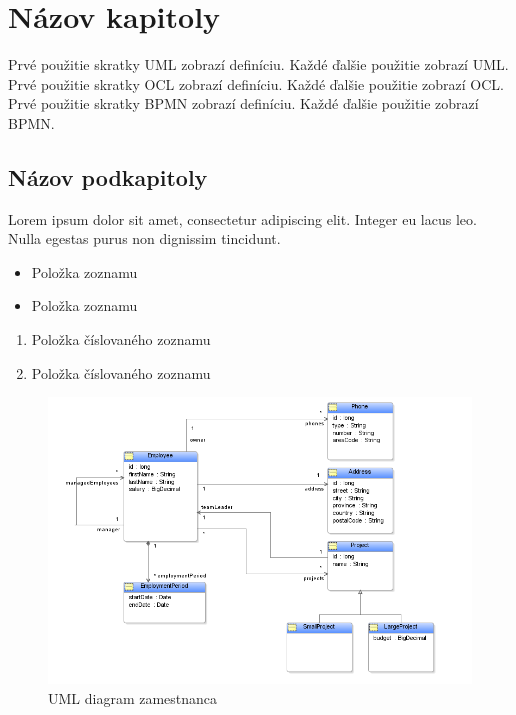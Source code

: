 \section{Názov kapitoly}
Prvé použitie skratky \gls{UML} zobrazí definíciu. Každé ďalšie použitie zobrazí \gls{UML}.\\
Prvé použitie skratky \gls{OCL} zobrazí definíciu. Každé ďalšie použitie zobrazí \gls{OCL}.\\
Prvé použitie skratky \gls{BPMN} zobrazí definíciu. Každé ďalšie použitie zobrazí \gls{BPMN}.

\subsection{Názov podkapitoly}
Lorem ipsum dolor sit amet, consectetur adipiscing elit. Integer eu lacus leo. Nulla egestas purus non dignissim tincidunt.
\begin{itemize}
    \item Položka zoznamu
    \item Položka zoznamu
\end{itemize}
\hfill
\begin{enumerate}
    \item Položka číslovaného zoznamu
    \item Položka číslovaného zoznamu
\end{enumerate}

\begin{figure}[h]
    \includegraphics{examples/images/employee-model.png}
    \caption{UML diagram zamestnanca}
    \label{fig:example1}
\end{figure}

